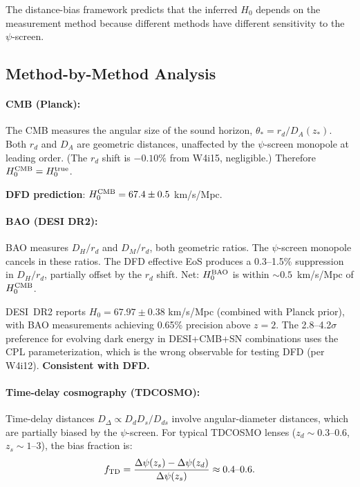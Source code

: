 \documentclass[11pt,a4paper]{article}
\newcounter{findingctr}
\newenvironment{finding}[1][]{%
  \refstepcounter{findingctr}%
  \begin{tcolorbox}[colback=blue!3!white, colframe=blue!50!black,
    title=\textbf{Finding \thefindingctr: #1}]
}{%
  \end{tcolorbox}%
}
\newcommand{\Dpsi}{\Delta\psi}
\begin{document}
\begin{finding}[\textbf{$H_0$ Method-Dependent Hierarchy from Distance Bias}]
\label{find:h0}

The distance-bias framework predicts that the inferred $H_0$ depends
on the measurement method because different methods have different
sensitivity to the $\psi$-screen.

\subsection*{Method-by-Method Analysis}

\paragraph{CMB (Planck):}
The CMB measures the angular size of the sound horizon,
$\theta_* = r_d/D_A(z_*)$.  Both $r_d$ and $D_A$ are geometric
distances, unaffected by the $\psi$-screen monopole at leading order.
(The $r_d$ shift is $-0.10\%$ from W4i15, negligible.)
Therefore $H_0^{\rm CMB} = H_0^{\rm true}$.

\textbf{DFD prediction}: $H_0^{\rm CMB} = 67.4 \pm 0.5$ km/s/Mpc.

\paragraph{BAO (DESI DR2):}
BAO measures $D_H/r_d$ and $D_M/r_d$, both geometric ratios.  The
$\psi$-screen monopole cancels in these ratios.  The DFD effective EoS
produces a 0.3--1.5\% suppression in $D_H/r_d$, partially offset by
the $r_d$ shift.  Net: $H_0^{\rm BAO}$ is within $\sim 0.5$~km/s/Mpc
of $H_0^{\rm CMB}$.

DESI~DR2 reports $H_0 = 67.97 \pm 0.38$ km/s/Mpc (combined with Planck
prior), with BAO measurements achieving 0.65\% precision above $z = 2$.
The 2.8--4.2$\sigma$ preference for evolving dark energy in DESI+CMB+SN
combinations uses the CPL parameterization, which is the wrong observable
for testing DFD (per W4i12).  \textbf{Consistent with DFD.}

\paragraph{Time-delay cosmography (TDCOSMO):}
Time-delay distances $D_\Delta \propto D_d D_s / D_{ds}$ involve
angular-diameter distances, which are partially biased by the
$\psi$-screen.  For typical TDCOSMO lenses ($z_d \sim 0.3$--$0.6$,
$z_s \sim 1$--$3$), the bias fraction is:
\begin{equation}
f_{\rm TD} = \frac{\Dpsi(z_s) - \Dpsi(z_d)}{\Dpsi(z_s)}
\approx 0.4\text{--}0.6.
\end{equation}


\end{finding}
\end{document}
